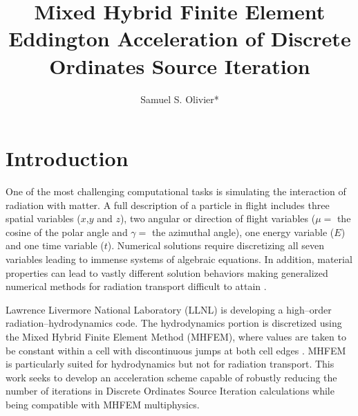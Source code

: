 \documentclass{anstrans}
\title{Mixed Hybrid Finite Element Eddington Acceleration of Discrete Ordinates Source Iteration}
\author{Samuel S. Olivier*}
\institute{Department of Nuclear Engineering, Texas A\&M University, College Station, TX 77843}
\begin{document}
\section{Introduction}
	One of the most challenging computational tasks is simulating the interaction of radiation with matter. 
	A full description of a particle in flight includes three spatial variables ($x$,$y$ and $z$), two angular or direction of flight variables ($\mu =$ the cosine of the polar angle and $\gamma =$ the azimuthal angle), one energy variable ($E$) and one time variable ($t$). Numerical solutions require discretizing all seven variables leading to immense systems of algebraic equations. In addition, material properties can lead to vastly different solution behaviors making generalized numerical methods for radiation transport difficult to attain \cite{adams}. 



	Lawrence Livermore National Laboratory (LLNL) is developing a high--order radiation--hydrodynamics code. The hydrodynamics portion is discretized using the Mixed Hybrid Finite Element Method (MHFEM), where values are taken to be constant within a cell with discontinuous jumps at both cell edges \cite{mhfem}. MHFEM is particularly suited for hydrodynamics but not for radiation transport. This work seeks to develop an acceleration scheme capable of robustly reducing the number of iterations in Discrete Ordinates Source Iteration calculations while being compatible with MHFEM multiphysics.   
\end{document}
